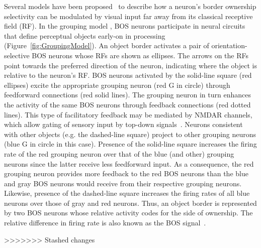 Several models have been proposed~\citep{Zhaoping05, Sakai_Nishimura06,Craft_etal07, Layton_etal12} to describe how a neuron's border ownership selectivity can be modulated by visual input far away from its classical receptive field (RF). In the grouping model
\citep{Craft_etal07}, BOS neurons participate in neural circuits that define perceptual objects early-on in processing (Figure~\ref{fig:GroupingModel}). An object border activates a pair of orientation-selective BOS neurons whose RFs are shown as ellipses. The arrows on the RFs point towards the preferred direction of the neuron, indicating where the object is relative to the neuron's RF. BOS neurons activated by the solid-line square (red ellipses) excite the appropriate grouping neuron (red G in circle) through feedforward connections (red solid lines). The grouping neuron in turn enhances the activity of the same BOS neurons through feedback connections (red dotted lines). This type of facilitatory feedback may be mediated by NMDAR channels, which allow gating of sensory input by top-down signals~\citep{Palmer_etal14}. Neurons consistent with other objects (e.g. the dashed-line square) project to other grouping neurons (blue G in circle in this case). Presence of the solid-line square increases the firing rate of the red grouping neuron over that of the blue (and other) grouping neurons since the latter receive less feedforward input. As a consequence, the red grouping neuron provides more feedback to the red BOS neurons than the blue and gray BOS neurons would receive from their respective grouping neurons. Likewise, presence of the dashed-line square increases the firing rates of all blue neurons over those of gray and red neurons. Thus, an object border is represented by two BOS neurons whose relative activity codes for the side of ownership. The relative difference in firing rate is also known as the BOS signal~\citep{Zhou_etal00}.


>>>>>>> Stashed changes
